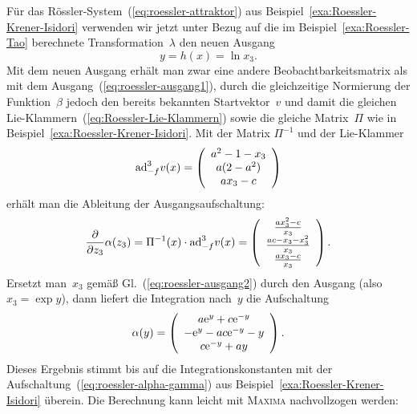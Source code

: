 \begin{example}
\label{exa:Roessler-Tao}Für das Rössler-System~(\ref{eq:roessler-attraktor})
aus Beispiel~\ref{exa:Roessler-Krener-Isidori} verwenden wir jetzt
unter Bezug auf die im Beispiel~\ref{exa:Roessler-Tao} berechnete
Transformation~$\lambda$ den neuen Ausgang 
\begin{equation}
y=h(x)=\ln x_{3}.\label{eq:roessler-ausgang2}
\end{equation}
Mit dem neuen Ausgang erhält man zwar eine andere Beobachtbarkeitsmatrix
als mit dem Ausgang~(\ref{eq:roessler-ausgang1}), durch die gleichzeitige
Normierung der Funktion~$\beta$ jedoch den bereits bekannten Startvektor~$v$
und damit die gleichen Lie-Klammern~(\ref{eq:Roessler-Lie-Klammern})
sowie die gleiche Matrix~$\Pi$ wie in Beispiel~\ref{exa:Roessler-Krener-Isidori}.
Mit der Matrix $\Pi^{-1}$ und der Lie-Klammer
\begin{equation}
{\operatorname{ad}}_{-f}^{3}v(x)=\left(\begin{array}{c}
a^{2}-1-x_{3}\\
a(2-a^{2})\\
ax_{3}-c
\end{array}\right)\label{eq:roessler-ad-n}
\end{equation}
erhält man die Ableitung der Ausgangsaufschaltung:
\[
\frac{\partial}{\partial z_{3}}\alpha(z_{3})=\Pi^{-1}(x)\cdot{\operatorname{ad}}_{-f}^{3}v(x)=\left(\begin{array}{c}
\frac{ax_{3}^{2}-c}{x_{3}}\\
\frac{ac-x_{3}-x_{3}^{2}}{x_{3}}\\
\frac{ax_{3}-c}{x_{3}}
\end{array}\right).
\]
Ersetzt man~$x_{3}$ gemäß Gl.~(\ref{eq:roessler-ausgang2}) durch
den Ausgang (also $x_{3}=\exp y$), dann liefert die Integration nach~$y$
die Aufschaltung
\begin{equation}
\alpha(y)=\left(\begin{array}{c}
a{\mathrm{e}}^{y}+c{\mathrm{e}}^{-y}\\
-{\mathrm{e}}^{y}-ac{\mathrm{e}}^{-y}-y\\
c{\mathrm{e}}^{-y}+ay
\end{array}\right).\label{eq:roessler-alpha-y2}
\end{equation}
Dieses Ergebnis stimmt bis auf die Integrationskonstanten mit der
Aufschaltung~(\ref{eq:roessler-alpha-gamma}) aus Beispiel~\ref{exa:Roessler-Krener-Isidori}
überein. Die Berechnung kann leicht mit \textsc{Maxima} nachvollzogen
werden:

\begin{maxima}\end{maxima}


\end{example}
